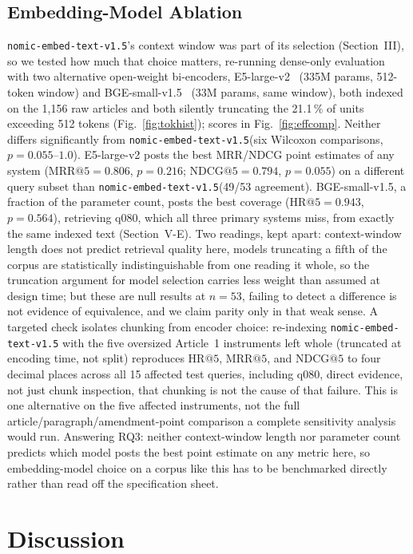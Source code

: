 \documentclass[conference,a4paper]{IEEEtran}
\makeatletter
\newcommand{\nomic}{\texttt{nomic-embed-text-v1.5}\xspace}
\newcommand{\HR}[1]{\mathrm{HR}@{#1}}
\newcommand{\MRR}[1]{\mathrm{MRR}@{#1}}
\newcommand{\NDCG}[1]{\mathrm{NDCG}@{#1}}
\makeatother
\begin{document}
\subsection{Embedding-Model Ablation}

\nomic's context window was part of its selection (Section~III), so
we tested how much that choice matters, re-running dense-only
evaluation with two alternative open-weight bi-encoders,
E5-large-v2~\cite{23} (335M params, 512-token window) and
BGE-small-v1.5~\cite{24} (33M params, same window), both indexed on
the 1{,}156 raw articles and both silently truncating the 21.1\,\%
of units exceeding 512 tokens (Fig.~\ref{fig:tokhist}); scores in
Fig.~\ref{fig:effcomp}.
Neither differs significantly from \nomic (six Wilcoxon comparisons,
$p{=}0.055$--$1.0$).
E5-large-v2 posts the best MRR/NDCG point estimates of any system
($\MRR{5}{=}0.806$, $p{=}0.216$; $\NDCG{5}{=}0.794$, $p{=}0.055$) on
a different query subset than \nomic (49/53 agreement).
BGE-small-v1.5, a fraction of the parameter count, posts the best
coverage ($\HR{5}{=}0.943$, $p{=}0.564$), retrieving q080, which all
three primary systems miss, from exactly the same indexed text
(Section~V-E).
Two readings, kept apart: context-window length does not predict
retrieval quality here, models truncating a fifth of the corpus are
statistically indistinguishable from one reading it whole, so the
truncation argument for model selection carries less weight than
assumed at design time; but these are null results at $n{=}53$,
failing to detect a difference is not evidence of equivalence, and we
claim parity only in that weak sense.
A targeted check isolates chunking from encoder choice: re-indexing
\nomic with the five oversized Article~1 instruments left whole
(truncated at encoding time, not split) reproduces $\HR{5}$, $\MRR{5}$,
and $\NDCG{5}$ to four decimal places across all 15 affected test
queries, including q080, direct evidence, not just chunk inspection,
that chunking is not the cause of that failure. This is one
alternative on the five affected instruments, not the full
article/paragraph/amendment-point comparison a complete sensitivity
analysis would run.
Answering RQ3: neither context-window length nor parameter count
predicts which model posts the best point estimate on any metric
here, so embedding-model choice on a corpus like this has to be
benchmarked directly rather than read off the specification sheet.

\section{Discussion}
\end{document}
